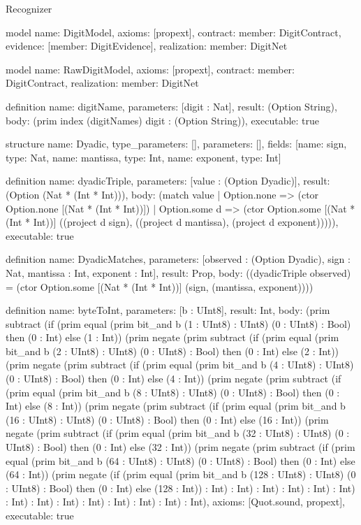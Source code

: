 \begin{lexlean}{Recognizer}
\begin{semanticmodule}
model{
  name: DigitModel,
  axioms: [propext],
  contract: {member: DigitContract},
  evidence: [{member: DigitEvidence}],
  realization: {member: DigitNet}
}

model{
  name: RawDigitModel,
  axioms: [propext],
  contract: {member: DigitContract},
  realization: {member: DigitNet}
}

definition{
  name: digitName,
  parameters: [digit : Nat],
  result: (Option String),
  body: (prim index (digitNames) digit : (Option String)),
  executable: true
}

structure{
  name: Dyadic,
  type_parameters: [],
  parameters: [],
  fields: [{name: sign, type: Nat}, {name: mantissa, type: Int}, {name: exponent, type: Int}]
}

definition{
  name: dyadicTriple,
  parameters: [value : (Option Dyadic)],
  result: (Option (Nat * (Int * Int))),
  body: (match value
    | Option.none => (ctor Option.none [(Nat * (Int * Int))])
    | Option.some d => (ctor Option.some [(Nat * (Int * Int))] ((project d sign), ((project d mantissa), (project d exponent))))),
  executable: true
}

definition{
  name: DyadicMatches,
  parameters: [observed : (Option Dyadic), sign : Nat, mantissa : Int, exponent : Int],
  result: Prop,
  body: ((dyadicTriple observed) = (ctor Option.some [(Nat * (Int * Int))] (sign, (mantissa, exponent))))
}

definition{
  name: byteToInt,
  parameters: [b : UInt8],
  result: Int,
  body: (prim subtract (if (prim equal (prim bit_and b (1 : UInt8) : UInt8) (0 : UInt8) : Bool) then (0 : Int) else (1 : Int)) (prim negate (prim subtract (if (prim equal (prim bit_and b (2 : UInt8) : UInt8) (0 : UInt8) : Bool) then (0 : Int) else (2 : Int)) (prim negate (prim subtract (if (prim equal (prim bit_and b (4 : UInt8) : UInt8) (0 : UInt8) : Bool) then (0 : Int) else (4 : Int)) (prim negate (prim subtract (if (prim equal (prim bit_and b (8 : UInt8) : UInt8) (0 : UInt8) : Bool) then (0 : Int) else (8 : Int)) (prim negate (prim subtract (if (prim equal (prim bit_and b (16 : UInt8) : UInt8) (0 : UInt8) : Bool) then (0 : Int) else (16 : Int)) (prim negate (prim subtract (if (prim equal (prim bit_and b (32 : UInt8) : UInt8) (0 : UInt8) : Bool) then (0 : Int) else (32 : Int)) (prim negate (prim subtract (if (prim equal (prim bit_and b (64 : UInt8) : UInt8) (0 : UInt8) : Bool) then (0 : Int) else (64 : Int)) (prim negate (if (prim equal (prim bit_and b (128 : UInt8) : UInt8) (0 : UInt8) : Bool) then (0 : Int) else (128 : Int)) : Int) : Int) : Int) : Int) : Int) : Int) : Int) : Int) : Int) : Int) : Int) : Int) : Int) : Int),
  axioms: [Quot.sound, propext],
  executable: true
}


\end{semanticmodule}
\end{lexlean}
